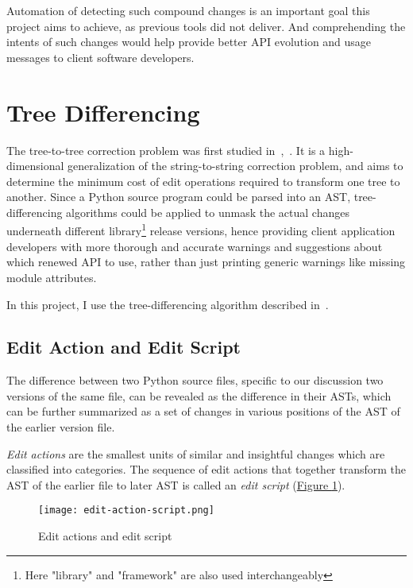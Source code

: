 Automation of detecting such compound changes is an important goal this project aims to achieve, as previous tools did not deliver. And comprehending the intents of such changes would help provide better API evolution and usage messages to client software developers.

\section{Tree Differencing}

The tree-to-tree correction problem was first studied in~\cite{tree-edit-p},~\cite{tree-correction-p}. It is a high-dimensional generalization of the string-to-string correction problem, and aims to determine the minimum cost of edit operations required to transform one tree to another. Since a Python source program could be parsed into an AST, tree-differencing algorithms could be applied to unmask the actual changes underneath different library\footnote{Here "library" and "framework" are also used interchangeably} release versions, hence providing client application developers with more thorough and accurate warnings and suggestions about which renewed API to use, rather than just printing generic warnings like missing module attributes.

In this project, I use the tree-differencing algorithm described in~\cite{DBLP:conf/kbse/FalleriMBMM14}.

\subsection{Edit Action and Edit Script}

The difference between two Python source files, specific to our discussion two versions of the same file, can be revealed as the difference in their ASTs, which can be further summarized as a set of changes in various positions of the AST of the earlier version file.

\textit{Edit actions} are the smallest units of similar and insightful changes which are classified into categories. The sequence of edit actions that together transform the AST of the earlier file to later AST is called an \textit{edit script} (\hyperref[fig:edit-action-script]{Figure \ref*{fig:edit-action-script}}).

\begin{figure}
	\caption{Edit actions and edit script}
	\label{fig:edit-action-script}
	\texttt{[image: edit-action-script.png]}
\end{figure}

